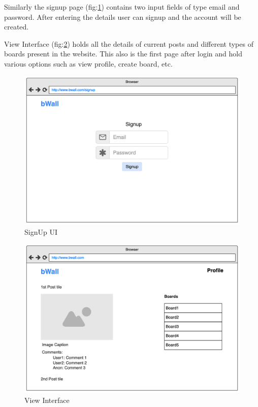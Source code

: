 \documentclass[12pt]{report}
\begin{document}
Similarly the signup page (fig:\ref{fig:signupui}) contains two input fields of type email and password. After entering the details user can signup and the account will be created.

View Interface (fig:\ref{fig:viewinterfaceui}) holds all the details of current posts and different types of boards present in the website. This also is the first page after login and hold various options such as view profile, create board, etc.

\begin{figure}[H]
\centering
\includegraphics[width=12cm]{uisignup.png}
\caption{SignUp UI}
\label{fig:signupui}
\end{figure}
\begin{figure}[H]
\centering
\includegraphics[width=12cm]{uiviewinterface.png}
\caption{View Interface}
\label{fig:viewinterfaceui}
\end{figure}
\end{document}
